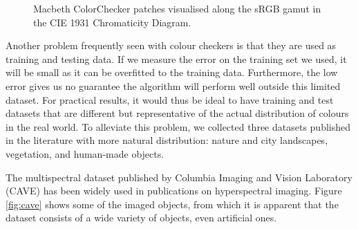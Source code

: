 \begin{figure}
    \centering
    \caption{Macbeth ColorChecker patches visualised along the sRGB gamut in the CIE 1931 Chromaticity Diagram.}
    \label{fig:macbeth_chromaticity}
\end{figure}


Another problem frequently seen with colour checkers is that they are used as training and testing data. If we measure the error on the training set we used, it will be small as it can be overfitted to the training data. Furthermore, the low error gives us no guarantee the algorithm will perform well outside this limited dataset. For practical results, it would thus be ideal to have training and test datasets that are different but representative of the actual distribution of colours in the real world. To alleviate this problem, we collected three datasets published in the literature with more natural distribution: nature and city landscapes, vegetation, and human-made objects.

The multispectral dataset published by Columbia Imaging and Vision Laboratory (CAVE) \cite{CAVE_0293} has been widely used in publications on hyperspectral imaging. Figure \ref{fig:cave} shows some of the imaged objects, from which it is apparent that the dataset consists of a wide variety of objects, even artificial ones. 

